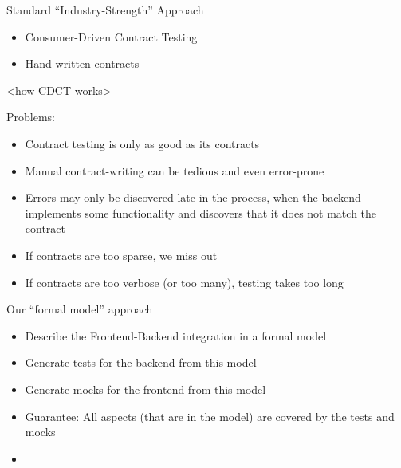 \begin{frame}[fragile]{Standard ``Industry-Strength'' Approach}


\begin{itemize}
\item Consumer-Driven Contract Testing
\item Hand-written contracts
\end{itemize}

<how CDCT works>

Problems:

\begin{itemize}
\item Contract testing is only as good as its contracts
\item Manual contract-writing can be tedious and even error-prone
\item Errors may only be discovered late in the process, when the backend implements some functionality and discovers that it does not match the contract
\item If contracts are too sparse, we miss out
\item If contracts are too verbose (or too many), testing takes too long
\end{itemize}

\end{frame}

\begin{frame}[fragile]{Our ``formal model'' approach}

\begin{itemize}
\item Describe the Frontend-Backend integration in a formal model
\item Generate tests for the backend from this model
\item Generate mocks for the frontend from this model
\item Guarantee: All aspects (that are in the model) are covered by the tests and mocks
\end{itemize}

\end{frame}

\begin{frame}[fragile]{}

\begin{itemize}
\item
\end{itemize}

\end{frame}

